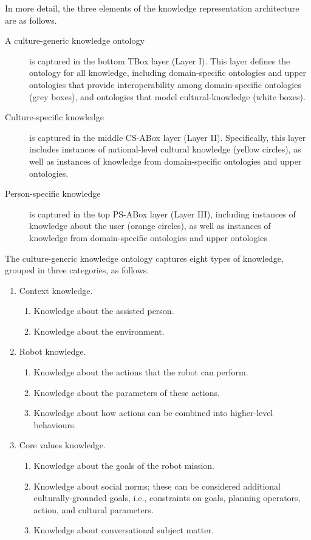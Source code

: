 \documentclass{CSSRforAfrica}
\begin{document}
In more detail, the three elements of the knowledge representation architecture are as follows.
\begin{description}
\item [A culture-generic knowledge ontology] is captured in the bottom TBox layer (Layer I). This layer defines the ontology for all knowledge, including domain-specific ontologies and upper ontologies that provide interoperability among domain-specific ontologies  (grey boxes), and ontologies that model cultural-knowledge  (white boxes).  

\item[Culture-specific knowledge] is captured in the middle CS-ABox layer (Layer II). Specifically, this layer  includes instances of national-level cultural knowledge  (yellow circles), as well as instances of knowledge from domain-specific ontologies and upper ontologies.  

\item[Person-specific knowledge] is captured in the top PS-ABox layer (Layer III), including instances of knowledge about the user (orange circles),  as well as instances of knowledge from domain-specific ontologies and upper ontologies
\end{description}
The culture-generic knowledge ontology captures eight types of knowledge, grouped in three categories, as follows.
\begin{enumerate}
\item Context knowledge.
\begin{enumerate}
\item Knowledge about the assisted person.
\item Knowledge about the environment.
\end{enumerate}
\item Robot knowledge.
\begin{enumerate}
\item Knowledge about the actions that the robot can perform.
\item Knowledge about the parameters of these actions.
\item Knowledge about how actions can be combined into higher-level behaviours.
\end{enumerate}
\item Core values knowledge.
\begin{enumerate}
\item Knowledge about the goals of the robot mission.
\item Knowledge about social norms; these can  be considered additional culturally-grounded goals, i.e., constraints  on goals, planning operators, action, and cultural parameters.
\item Knowledge about conversational subject matter.
\end{enumerate}
\end{enumerate}
\end{document}
